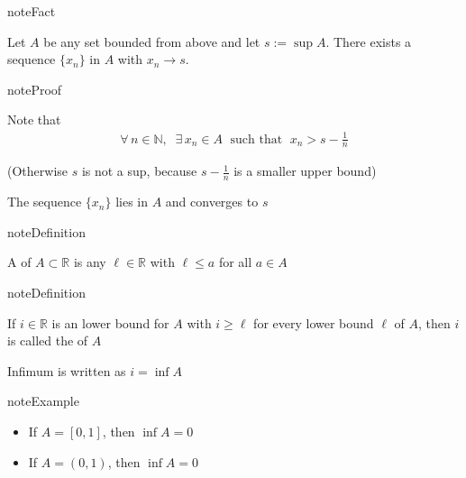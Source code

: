 \documentclass[letterpaper,10pt,english]{jupyterBook}
\begin{document}
\begin{sphinxadmonition}{note}{Fact}

\sphinxAtStartPar
Let \(A\) be any set bounded from above and let \(s := \sup A\).
There exists a sequence \(\{x_n\}\) in \(A\) with \(x_n \to s\).
\end{sphinxadmonition}

\begin{sphinxadmonition}{note}{Proof}

\sphinxAtStartPar
Note that
\begin{equation*}
\begin{split}
%
\forall \, n \in \mathbb{N}, \;\; \exists \, x_n \in A \; \text{ such that } \; x_n > s - \frac{1}{n}
%
\end{split}
\end{equation*}
\begin{figure}[H]
\centering

\noindent{}
\end{figure}

\sphinxAtStartPar
(Otherwise \(s\) is not a sup, because \(s-\frac{1}{n}\) is a smaller upper bound)

\sphinxAtStartPar
The sequence \(\{x_n\}\) lies in \(A\) and converges to \(s\)
\end{sphinxadmonition}

\begin{sphinxadmonition}{note}{Definition}

\sphinxAtStartPar
A  of \(A \subset \mathbb{R}\) is any \(\ell \in \mathbb{R}\) with \(\ell \leq a\) for all \(a \in A\)
\end{sphinxadmonition}

\begin{sphinxadmonition}{note}{Definition}

\sphinxAtStartPar
If \(i \in \mathbb{R}\) is an lower bound for \(A\) with \(i \geq \ell\) for every
lower bound \(\ell\) of \(A\), then \(i\) is called the
 of \(A\)
\end{sphinxadmonition}

\sphinxAtStartPar
Infimum is written as \(i = \inf A\)

\begin{sphinxadmonition}{note}{Example}
\begin{itemize}
\item {} 
\sphinxAtStartPar
If \(A = [0, 1]\), then \(\inf A = 0\)

\item {} 
\sphinxAtStartPar
If \(A = (0, 1)\), then \(\inf A = 0\)

\end{itemize}
\end{sphinxadmonition}
\end{document}
